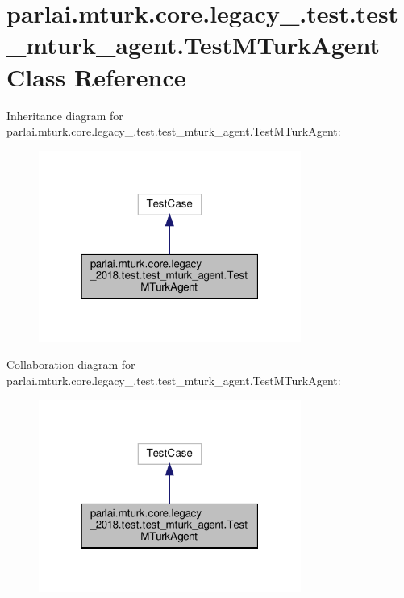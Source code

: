 \hypertarget{classparlai_1_1mturk_1_1core_1_1legacy__2018_1_1test_1_1test__mturk__agent_1_1TestMTurkAgent}{}\section{parlai.\+mturk.\+core.\+legacy\+\_.\+test.\+test\+\_\+mturk\+\_\+agent.\+Test\+M\+Turk\+Agent Class Reference}
\label{classparlai_1_1mturk_1_1core_1_1legacy__2018_1_1test_1_1test__mturk__agent_1_1TestMTurkAgent}


Inheritance diagram for parlai.\+mturk.\+core.\+legacy\+\_.\+test.\+test\+\_\+mturk\+\_\+agent.\+Test\+M\+Turk\+Agent\+:
\nopagebreak
\begin{figure}[H]
\begin{center}
\leavevmode
\includegraphics[width=244pt]{da/d86/classparlai_1_1mturk_1_1core_1_1legacy__2018_1_1test_1_1test__mturk__agent_1_1TestMTurkAgent__inherit__graph}
\end{center}
\end{figure}


Collaboration diagram for parlai.\+mturk.\+core.\+legacy\+\_.\+test.\+test\+\_\+mturk\+\_\+agent.\+Test\+M\+Turk\+Agent\+:
\nopagebreak
\begin{figure}[H]
\begin{center}
\leavevmode
\includegraphics[width=244pt]{df/de6/classparlai_1_1mturk_1_1core_1_1legacy__2018_1_1test_1_1test__mturk__agent_1_1TestMTurkAgent__coll__graph}
\end{center}
\end{figure}
